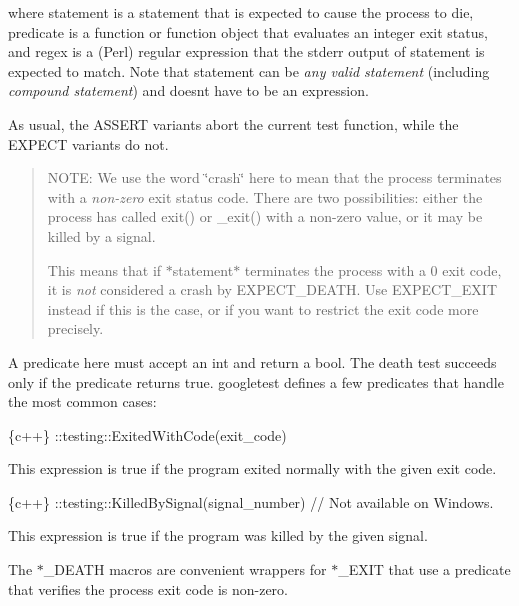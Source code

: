 where {\ttfamily statement} is a statement that is expected to cause the process to die, {\ttfamily predicate} is a function or function object that evaluates an integer exit status, and {\ttfamily regex} is a (Perl) regular expression that the stderr output of {\ttfamily statement} is expected to match. Note that {\ttfamily statement} can be {\itshape any valid statement} (including {\itshape compound statement}) and doesn\textquotesingle{}t have to be an expression.

As usual, the {\ttfamily A\+S\+S\+E\+RT} variants abort the current test function, while the {\ttfamily E\+X\+P\+E\+CT} variants do not.

\begin{quote}
N\+O\+TE\+: We use the word \char`\"{}crash\char`\"{} here to mean that the process terminates with a {\itshape non-\/zero} exit status code. There are two possibilities\+: either the process has called {\ttfamily exit()} or {\ttfamily \+\_\+exit()} with a non-\/zero value, or it may be killed by a signal.

This means that if {\ttfamily $\ast$statement$\ast$} terminates the process with a 0 exit code, it is {\itshape not} considered a crash by {\ttfamily E\+X\+P\+E\+C\+T\+\_\+\+D\+E\+A\+TH}. Use {\ttfamily E\+X\+P\+E\+C\+T\+\_\+\+E\+X\+IT} instead if this is the case, or if you want to restrict the exit code more precisely. \end{quote}


A predicate here must accept an {\ttfamily int} and return a {\ttfamily bool}. The death test succeeds only if the predicate returns {\ttfamily true}. googletest defines a few predicates that handle the most common cases\+:


\begin{DoxyCode}
\{c++\}
::testing::ExitedWithCode(exit\_code)
\end{DoxyCode}


This expression is {\ttfamily true} if the program exited normally with the given exit code.


\begin{DoxyCode}
\{c++\}
::testing::KilledBySignal(signal\_number)  // Not available on Windows.
\end{DoxyCode}


This expression is {\ttfamily true} if the program was killed by the given signal.

The {\ttfamily $\ast$\+\_\+\+D\+E\+A\+TH} macros are convenient wrappers for {\ttfamily $\ast$\+\_\+\+E\+X\+IT} that use a predicate that verifies the process\textquotesingle{} exit code is non-\/zero.

